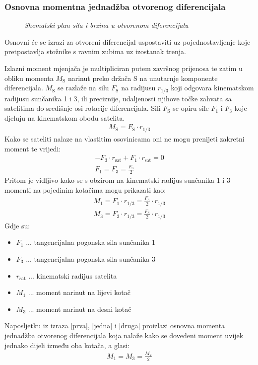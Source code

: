 \documentclass[11pt]{article}
\numberwithin{equation}{section}%
\begin{document}
\subsubsection{Osnovna momentna jednadžba otvorenog diferencijala}

\begin{figure}
 \centering
 \def\svgwidth{16cm}
 
 \caption{\textit{Shematski plan sila i brzina u otvorenom diferencijalu} \cite{2023basiclars}}
 \label{fig:otvoreni_sile}
\end{figure} 

Osnovni će se izrazi za otvoreni diferencijal uspostaviti uz pojednostavljenje koje pretpostavlja stožnike s ravnim zubima uz izostanak trenja.

Izlazni moment mjenjača je multipliciran putem završnog prijenosa te zatim u obliku momenta $M_\text{S}$ narinut preko držača S na unutarnje komponente diferencijala. $M_\text{S}$ se razlaže na silu $F_\text{S}$ na radijusu $r_{1/3}$ koji odgovara kinematskom radijusu sunčanika 1 i 3, ili preciznije, udaljenosti njihove točke zahvata sa satelitima do središnje osi rotacije diferencijala. Sili $F_\text{S}$ se opiru sile $F_1$ i $F_3$ koje djeluju na kinematskom obodu satelita.
%
\begin{gather}
M_\text{S}=F_ \text{S}\cdot r_{1/3} \label{prva}
\end{gather}
%
Kako se sateliti nalaze na vlastitim osovinicama oni ne mogu prenijeti zakretni moment te vrijedi:
%
\begin{gather}
	-F_3\cdot r_\text{sat}+F_1\cdot r_\text{sat}=0\\
	F_1=F_3=\frac{F_\text{S}}{2}
\end{gather}
%
Pritom je vidljivo kako se s obzirom na kinematski radijus sunčanika 1 i 3 momenti na pojedinim kotačima mogu prikazati kao:
%
\begin{gather}
	M_1=F_1\cdot r_{1/3}=\frac{F_\text{S}}{2}\cdot r_{1/3} \label{jedna} \\
	M_3=F_3\cdot r_{1/3}=\frac{F_\text{S}}{2}\cdot r_{1/3} \label{druga}
\end{gather}
%
Gdje su:
\begin{itemize}
	\item[]$F_1$ ... tangencijalna pogonska sila sunčanika 1
	\item[]$F_3$ ... tangencijalna pogonska sila sunčanika 3
	\item[]$r_\text{sat}$ ... kinematski radijus satelita
	\item[]$M_1$ ... moment narinut na lijevi kotač
	\item[]$M_3$ ... moment narinut na desni kotač
\end{itemize}
%
Naposljetku iz izraza \ref{prva}, \ref{jedna} i \ref{druga} proizlazi osnovna momenta jednadžba otvorenog diferencijala koja nalaže kako se dovedeni moment uvijek jednako dijeli između oba kotača, a glasi:
\begin{gather}
	M_1=M_3=\frac{M_\text{S}}{2}
\end{gather}
\end{document}
